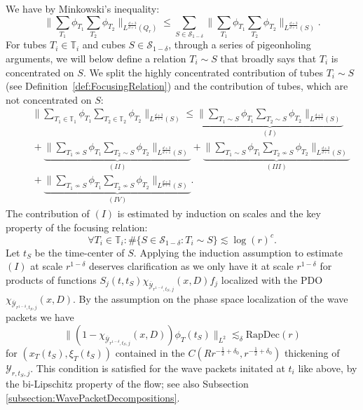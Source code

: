 \documentclass{amsart}
\theoremstyle{definition}
\newcommand{\T}{\mathbb{T}}
\begin{document}
We have by Minkowski's inequality:
\begin{equation*}
\big\| \sum_{T_1} \phi_{T_1} \sum_{T_2} \phi_{T_2} \big\|_{L^{\frac{d+3}{d+1}}(Q_r)} \leq \sum_{S \in \mathcal{S}_{1-\delta}} \big\| \sum_{T_1} \phi_{T_1} \sum_{T_2} \phi_{T_2} \big\|_{L^{\frac{d+3}{d+1}}(S)}. 
\end{equation*}
For tubes $T_i \in \T_i$ and cubes $S \in \mathcal{S}_{1-\delta}$, through a series of pigeonholing arguments, we will below define a relation $T_i \sim S$ that broadly says that $T_i$ is concentrated on $S$. We split the highly concentrated contribution of tubes $T_i \sim S$ (see Definition~\ref{def:FocusingRelation}) and the contribution of tubes, which are not concentrated on $S$:
\begin{equation}
\label{eq:SplittingConcentration}
\begin{split}
&\quad \big\| \sum_{T_1 \in \T_1} \phi_{T_1} \sum_{T_2 \in \T_2} \phi_{T_2}  \big\|_{L^{\frac{d+3}{d+1}}(S)} \leq \underbrace{\big\| \sum_{T_1 \sim S} \phi_{T_1} \sum_{T_2 \sim S} \phi_{T_2} \big\|_{L^{\frac{d+3}{d+1}}(S)}}_{(I)} \\
&\quad + \underbrace{\big\| \sum_{T_1 \not\sim S} \phi_{T_1} \sum_{T_2 \sim S} \phi_{T_2} \big\|_{L^{\frac{d+3}{d+1}}(S)}}_{(II)} + \underbrace{\big\| \sum_{T_1 \sim S} \phi_{T_1} \sum_{T_2 \not\sim S} \phi_{T_2} \big\|_{L^{\frac{d+3}{d+1}}(S)}}_{(III)} \\
&\quad + \underbrace{\big\| \sum_{T_1 \not\sim S} \phi_{T_1} \sum_{T_2 \not\sim S} \phi_{T_2} \big\|_{L^{\frac{d+3}{d+1}}(S)}}_{(IV)}.
\end{split}
\end{equation}
The contribution of $(I)$ is estimated by induction on scales and the key property of the focusing relation:
\begin{equation}
\label{eq:EssentialDisjointConcentration}
\forall T_i \in \T_i: \# \{ S \in \mathcal{S}_{1-\delta} : T_i \sim S \} \lesssim \log(r)^c.
\end{equation}
Let $t_S$ be the time-center of $S$. Applying the induction assumption to estimate $(I)$ at scale $r^{1-\delta}$ deserves clarification as we only have it at scale $r^{1-\delta}$ for products of functions $S_j(t,t_S) \chi_{\overline{\mathcal{Y}}_{r^{1-\delta},t_S,j}}(x,D) f_j$ localized with the PDO $\chi_{\overline{\mathcal{Y}}_{r^{1-\delta},t_S,j}}(x,D)$. By the assumption on the phase space localization of the wave packets we have
\begin{equation}
\label{eq:WavePacketMicroLocalization}
\| (1- \chi_{\overline{\mathcal{Y}}_{r^{1-\delta},t_S,j}}(x,D)) \phi_T(t_S) \|_{L^2} \lesssim_{\delta} \text{RapDec}(r)
\end{equation}
for $(x_{T}(t_S),\xi_{T}(t_S))$ contained in the $C (R r^{-\frac12+\delta_0},r^{-\frac{1}{2}+\delta_0})$ thickening of \\ ${\mathcal{Y}}_{r,t_S,j}$.
This condition is satisfied for the wave packets initated at $t_i$ like above, by the bi-Lipschitz property of the flow; see also Subsection \ref{subsection:WavePacketDecompositions}.
\end{document}
